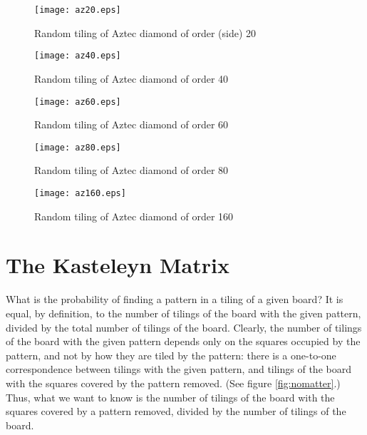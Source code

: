 \documentclass[10pt,reqno]{amsart}
\theoremstyle{plain}
\theoremstyle{definition}
\theoremstyle{remark}
\begin{document}
\begin{figure}
        \begin{minipage}[b]{0.5\linewidth}
                \centering \texttt{[image: az20.eps]}
                \caption{Random tiling of Aztec diamond of order (side) 20}\label{fig:b}   
        \end{minipage}%
        \begin{minipage}[b]{0.5\linewidth}
                \centering \texttt{[image: az40.eps]}
                \caption{Random tiling of Aztec diamond of order 40}\label{fig:c}
        \end{minipage}%
\end{figure}
\begin{figure}
        \begin{minipage}[b]{0.5\linewidth}
                \centering \texttt{[image: az60.eps]}
                \caption{Random tiling of Aztec diamond of order 60} \label{fig:d}   
        \end{minipage}%
        \begin{minipage}[b]{0.5\linewidth}
                \centering \texttt{[image: az80.eps]}
                \caption{Random tiling of Aztec diamond of order 80}\label{fig:e}
        \end{minipage}%
\end{figure}
\begin{figure}
	\centering \texttt{[image: az160.eps]}
	\caption{Random tiling of Aztec diamond of order 160}\label{fig:f}
\end{figure}

\section{The Kasteleyn Matrix}

What is the probability of finding a pattern in a tiling of a given board?
It is equal, by definition, to the number of tilings of the
board with the given pattern, divided by the total number of tilings
of the board. Clearly, the number of tilings of the board with the
given pattern depends only on the squares occupied by the pattern, and not
by how they are tiled by the pattern: there is a one-to-one correspondence
between tilings with the given pattern, and tilings of the
board with the squares covered by the pattern removed. (See figure 
\ref{fig:nomatter}.) Thus, what we want to know is the number of tilings
of the board with the squares covered by a pattern removed, divided
by the number of tilings of the board.
\end{document}
